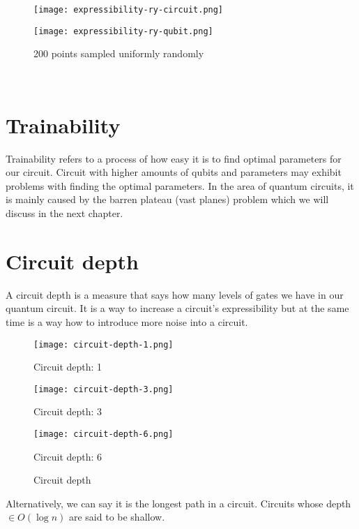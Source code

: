 \begin{figure}[H]
    \centering
    \begin{minipage}{0.4\linewidth}
        \centering
        \texttt{[image: expressibility-ry-circuit.png]}
        \vfill
    \end{minipage}
    \hfill
    \begin{minipage}{0.4\linewidth}
        \centering
        \texttt{[image: expressibility-ry-qubit.png]}
        \vfill
    \end{minipage}
    \caption{200 points sampled uniformly randomly}
\end{figure}
\\


\section{Trainability}
Trainability refers to a process of how easy it is to find optimal parameters for our circuit. Circuit with higher amounts of qubits and parameters may exhibit problems with finding the optimal parameters. In the area of quantum circuits, it is mainly caused by the barren plateau (vast planes) problem which we will discuss in the next chapter.

\section{Circuit depth}
A circuit depth is a measure that says how many levels of gates we have in our quantum circuit. It is a way to increase a circuit's expressibility but at the same time is a way how to introduce more noise into a circuit. 

\begin{figure}[H]
    \centering
    \begin{minipage}{0.2\linewidth}
        \centering
        \texttt{[image: circuit-depth-1.png]}
        \caption*{Circuit depth: 1}\label{fig:circuit_depth_1}
    \end{minipage}
    \hfill
    \begin{minipage}{0.3\linewidth}
        \centering
        \texttt{[image: circuit-depth-3.png]}
        \caption*{Circuit depth: 3}\label{fig:circuit_depth_3}
    \end{minipage}
    \hfill
    \begin{minipage}{0.45\linewidth}
        \centering
        \texttt{[image: circuit-depth-6.png]}
        \caption*{Circuit depth: 6}\label{fig:circuit_depth_6}
    \end{minipage}
    \caption{Circuit depth}
\end{figure}
Alternatively, we can say it is the longest path in a circuit. Circuits whose depth $\in O(\log n)$ are said to be shallow.

